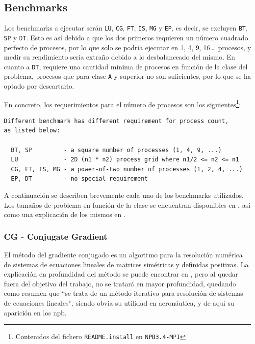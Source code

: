 \subsection{Benchmarks}
\label{ssec:benchmarks}

Los benchmarks a ejecutar serán \texttt{LU}, \texttt{CG}, \texttt{FT}, \texttt{IS}, \texttt{MG} y \texttt{EP}, es decir, se excluyen \texttt{BT}, \texttt{SP} y \texttt{DT}. Esto es así debido a que los dos primeros requieren un número cuadrado perfecto de procesos, por lo que solo se podría ejecutar en 1, 4, 9, 16\dots\ procesos, y medir su rendimiento sería extraño debido a lo desbalanceado del mismo. En cuanto a \texttt{DT}, requiere una cantidad mínima de procesos en función de la clase del problema, procesos que para clase \texttt{A} y superior no son suficientes, por lo que se ha optado por descartarlo.

En concreto, los requerimientos para el número de procesos son los siguientes\footnote{Contenidos del fichero \texttt{README.install} en \texttt{NPB3.4-MPI}}:

\begin{lstlisting}
Different benchmark has different requirement for process count,
as listed below:

  BT, SP         - a square number of processes (1, 4, 9, ...)
  LU             - 2D (n1 * n2) process grid where n1/2 <= n2 <= n1
  CG, FT, IS, MG - a power-of-two number of processes (1, 2, 4, ...)
  EP, DT         - no special requirement
\end{lstlisting}

A continuación se describen brevemente cada uno de los benchmarks utilizados. Los tamaños de problema en función de la clase se encuentran disponibles en \cite{npb_problem_sizes}, así como una explicación de los mismos en \cite{benchmarks1994technical}. 

\subsubsection{CG - Conjugate Gradient}
\label{sssec:benchmarks__cg}
El método del gradiente conjugado es un algoritmo para la resolución numérica de sistemas de ecuaciones lineales de matrices simétricas y definidas positivas. La explicación en profundidad del método se puede encontrar en \cite[2.2.3]{hestenes1952methods}, pero al quedar fuera del objetivo del trabajo, no se tratará en mayor profundidad, quedando como resumen que ``se trata de un método iterativo para resolución de sistemas de ecuaciones lineales'', siendo obvia su utilidad en aeronáutica, y de aquí su aparición en los \acrlong{npb}.

